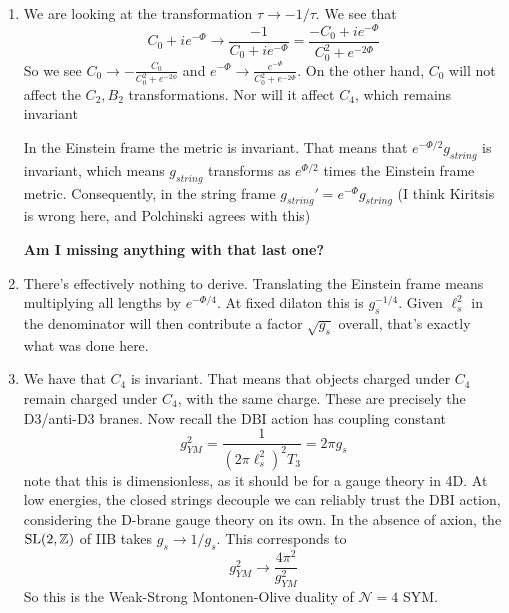 \documentclass[11pt, class=article, crop=false]{standalone}
\begin{document}
\begin{enumerate}
	\textbf{I have only shown classical equivalence. How to I prove this is quantum-mechanically true as well?}
	
	
	\item We are looking at the transformation $\tau \to -1/\tau$. We see that 
	\[
		C_0 + i e^{- \Phi} \to \frac{-1}{C_0 + i e^{- \Phi}} = \frac{-C_0 + i e^{- \Phi}}{C_0^2 + e^{-2\Phi}}
	\]
	So we see $C_0 \to - \frac{C_0}{C_0^2 + e^{-2\phi}}$ and $e^{-\Phi} \to \frac{e^{-\Phi}}{C_0^2 + e^{-2\Phi}}$. On the other hand, $C_0$ will not affect the $C_2, B_2$ transformations. Nor will it affect $C_4$, which remains invariant
	
	In the Einstein frame the metric is invariant. That means that $e^{-\Phi/2} g_{string}$ is invariant, which means $g_{string}$ transforms as $e^{\Phi/2}$ times the Einstein frame metric. Consequently, in the string frame $g_{string}' = e^{-\Phi} g_{string}$ (I think Kiritsis is wrong here, and Polchinski agrees with this)

	\textbf{Am I missing anything with that last one?}
	
	\item There's effectively nothing to derive. Translating the Einstein frame means multiplying all lengths by $e^{-\Phi/4}$. At fixed dilaton this is $g_s^{-1/4}$. Given $\ell_s^2$ in the denominator will then contribute a factor $\sqrt{g_s}$ overall, that's exactly what was done here.  
	
	\item We have that $C_4$ is invariant. That means that objects charged under $C_4$ remain charged under $C_4$, with the same charge. These are precisely the D3/anti-D3 branes. Now recall the DBI action has coupling constant
	\[
		g_{YM}^2 = \frac{1}{(2\pi \ell_s^2)^2 T_3} = 2 \pi g_s
	\]
	note that this is dimensionless, as it should be for a gauge theory in 4D. At low energies, the closed strings decouple we can reliably trust the DBI action, considering the D-brane gauge theory on its own. In the absence of axion, the $\mathrm{SL}(2, \mathbb{Z})$ of IIB takes $g_s \to 1/g_s$. This corresponds to
	\[
		g^2_{YM} \to \frac{4\pi^2}{g_{YM}^2}
	\]
	So this is the Weak-Strong Montonen-Olive duality of $\mathcal N=4$ SYM.
	

\end{enumerate}
\end{document}
